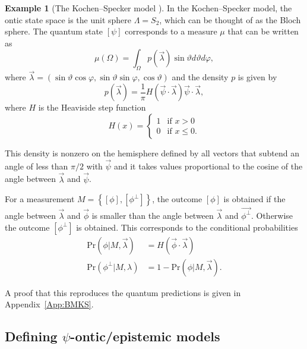 \documentclass[DIV=calc,paper=a4,fontsize=11pt,twocolumn]{scrartcl} %
\theoremstyle{definition}
\newtheorem{example}[definition]{Example}
\theoremstyle{plain}
\newcommand{\Proj}[1]{\ensuremath{\left [ #1 \right ]}}
\begin{document}
\begin{example}[The Kochen--Specker model \cite{Kochen1967}]
In the Kochen--Specker model, the ontic state space is the unit
sphere $\Lambda = S_2$, which can be thought of as the Bloch sphere.
The quantum state $\Proj{\psi}$ corresponds to a measure $\mu$ that
can be written as
\begin{equation}
\mu(\Omega) = \int_{\Omega} p(\vec{\lambda}) \sin \vartheta d
\vartheta d \varphi,
\end{equation}
where $\vec{\lambda} = (\sin \vartheta \cos \varphi, \sin \vartheta
\sin \varphi, \cos \vartheta)$ and the density $p$ is given by
\begin{equation}
p(\vec{\lambda}) = \frac{1}{\pi} H(\vec{\psi} \cdot
\vec{\lambda}) \vec{\psi} \cdot \vec{\lambda},
\end{equation}
where $H$ is the Heaviside step function
\begin{equation}
H(x) = \begin{cases}1 & \text{if} \,\, x>0 \\ 0 & \text{if}
\,\, x\leq 0. \end{cases}
\end{equation}

This density is nonzero on the hemisphere defined by all vectors
that subtend an angle of less than $\pi/2$ with $\vec{\psi}$ and it
takes values proportional to the cosine of the angle between
$\vec{\lambda}$ and $\vec{\psi}$.

For a measurement $M = \left \{\Proj{\phi},\Proj{\phi^{\perp}}\right
\}$, the outcome $\Proj{\phi}$ is obtained if the angle between
$\vec{\lambda}$ and $\vec{\phi}$ is smaller than the angle between
$\vec{\lambda}$ and $\vec{\phi^{\perp}}$.  Otherwise the outcome
$\Proj{\phi^{\perp}}$ is obtained.  This corresponds to the
conditional probabilities
\begin{align}
\text{Pr}(\phi|M,\vec{\lambda}) & = H (\vec{\phi} \cdot
\vec{\lambda}) \\
\text{Pr}(\phi^{\perp}|M,\lambda) & = 1 -
\text{Pr}(\phi|M,\vec{\lambda}).
\end{align}

A proof that this reproduces the quantum predictions is given in
Appendix~\ref{App:BMKS}.
\end{example}

\subsection{Defining $\psi$-ontic/epistemic models}

\label{POEM}
\end{document}
